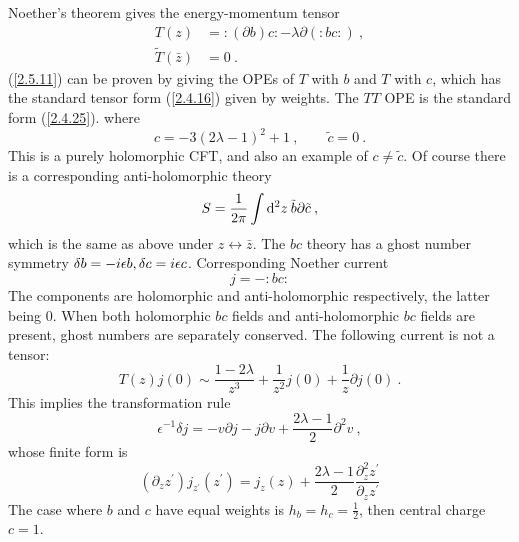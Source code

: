 Noether's theorem gives the energy-momentum tensor    
\begin{subequations}\label{2.5.11}
	\begin{align}
		T(z)&=:\mathrel{(\partial b) c}:-\lambda \partial(:\mathrel{b c}:)  \:,  \label{2.5.11a}\\
		\tilde{T}(\bar{z})&=0  \:. \label{2.5.11b}
	\end{align}
\end{subequations}
(\ref{2.5.11}) can be proven by giving the OPEs of $T$ with $b$ and $T$ with $c$, which has the standard tensor form (\ref{2.4.16}) given by weights. The $TT$ OPE is the standard form (\ref{2.4.25}).    
where    
\begin{equation}
	c=-3(2 \lambda-1)^{2}+1\:, \qquad \tilde{c}=0 \:. \label{2.5.12}
\end{equation}
This is a purely holomorphic CFT, and also an example of $c \neq \tilde{c}$. Of course there is a corresponding anti-holomorphic theory    
\begin{equation}
	S=\frac{1}{2 \pi} \int \mathrm{d}^{2} z \: \tilde{b} \partial \tilde{c} \:,
\end{equation}
which is the same as above under $z \leftrightarrow \bar{z}$.    
The $bc$ theory has a ghost number symmetry $\delta b=-i \epsilon b, \delta c=i \epsilon c$. Corresponding Noether current    
\begin{equation}\label{2.5.14}
	j=-:\mathrel{b c}:
\end{equation}
The components are holomorphic and anti-holomorphic respectively, the latter being 0. When both holomorphic $bc$ fields and anti-holomorphic $bc$ fields are present, ghost numbers are separately conserved.    
The following current is not a tensor:    
\begin{equation}
	T(z) j(0) \sim \frac{1-2 \lambda}{z^{3}}+\frac{1}{z^{2}} j(0)+\frac{1}{z} \partial j(0) \:. \label{2.5.15}
\end{equation}
This implies the transformation rule    
\begin{equation} \label{2.5.16}
	\epsilon^{-1} \delta j=-v \partial j-j \partial v+\frac{2 \lambda-1}{2} \partial^{2} v \:,
\end{equation}
whose finite form is    
\begin{equation}\label{2.5.17}
	(\partial_{z} z^{\prime}) j_{z^{\prime}}(z^{\prime})=j_{z}(z)+\frac{2 \lambda-1}{2} \frac{\partial_{z}^{2} z^{\prime}}{\partial_{z} z^{\prime}}
\end{equation}
The case where $b$ and $c$ have equal weights is $h_{b}=h_{c}=\frac{1}{2}$, then central charge $c=1$.    
